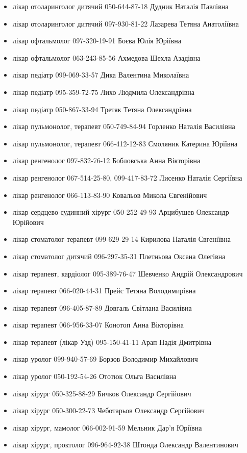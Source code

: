 \begin{itemize}
  \item лікар отоларинголог дитячий 050-644-87-18 Дудник Наталія Павлівна
  \item лікар отоларинголог дитячий 097-930-81-22 Лазарева Тетяна Анатоліївна 
  \item лікар офтальмолог 097-320-19-91 Боєва Юлія Юріївна
  \item лікар офтальмолог 063-243-85-56 Ахмедова Шехла Азадівна 
  \item лікар педіатр 099-069-33-57 Дика Валентина Миколаївна  
  \item лікар педіатр 095-359-72-75 Лихо Людмила Олександрівна 
  \item лікар педіатр 050-867-33-94 Третяк Тетяна Олександрівна 
  \item лікар пульмонолог, терапевт 050-749-84-94 Горленко Наталія Василівна
  \item лікар пульмонолог, терапевт 066-412-12-83 Смоляник Катерина Юріївна 
  \item лікар ренгенолог 097-832-76-12 Бобловська Анна Вікторівна
  \item лікар ренгенолог 067-514-25-80, 099-417-83-72 Лисенко Наталія Сергіївна
  \item лікар ренгенолог 066-113-83-90 Ковальов Микола Євгенійович
  \item лікар сердцево-судинний хірург 050-252-49-93 Арцибушев Олександр Юрійович
  \item лікар стоматолог-терапевт 099-629-29-14 Кирилова Наталія Євгеніївна
  \item лікар стоматолог дитячий 096-297-35-31 Плетньова Оксана Олегівна 
  \item лікар терапевт, кардіолог 095-389-76-47 Шевченко Андрій Олександрович
  \item лікар терапевт 066-020-44-31 Прейс Тетяна Володимирівна
  \item лікар терапевт 096-405-87-89 Довгаль Світлана Василівна
  \item лікар терапевт 066-956-33-07 Конотоп Анна Вікторівна 
  \item лікар терапевт (лікар Узд) 095-150-41-11 Арап Надія Дмитрівна
  \item лікар уролог 099-940-57-69 Борзов Володимир Михайлович 
  \item лікар уролог  050-192-54-26 Ототюк Ольга Василівна 
  \item лікар хірург  050-325-88-29 Бичков Олександр Сергійович 
  \item лікар хірург 050-300-22-73 Чеботарьов Олександр Сергійович
  \item лікар хірург,  мамолог 066-002-91-59 Мельник Дар’я Юріївна
  \item лікар хірург, проктолог 096-964-92-38 Штонда Олександр Валентинович
\end{itemize}

